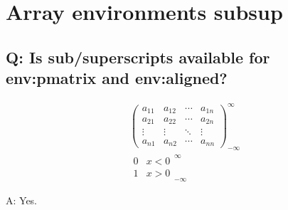 \documentclass[11pt]{revtex4-1}
\begin{document}
\section{Array environments subsup}

\subsection*{Q: Is sub/superscripts available for env:pmatrix and env:aligned?}
\begin{align}
  \begin{pmatrix}
    a_{11} & a_{12} & \cdots & a_{1n} \\
    a_{21} & a_{22} & \cdots & a_{2n} \\
    \vdots & \vdots & \ddots & \vdots \\
    a_{n1} & a_{n2} & \cdots & a_{nn}
  \end{pmatrix}_{-\infty}^\infty \\
  \begin{aligned}
    0 & x < 0 \\
    1 & x > 0
  \end{aligned}_{-\infty}^\infty
\end{align}

A: Yes.
\end{document}
